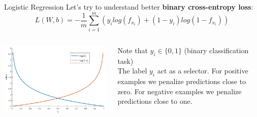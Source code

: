 \documentclass[aspectratio=169]{beamer}
\begin{document}
\begin{frame}{Logistic Regression}
Let's try to understand better \textbf{binary cross-entropy loss}:
\begin{equation}
L(W, b) = - \frac{1}{m} \sum_{i=1}^{m} \left(y_i log(f_{x_i}) + (1-y_i)log(1-f_{x_i})\right)
\end{equation}
\begin{columns}
\begin{column}{0.4\textwidth}
	\includegraphics[width=\textwidth]{img/dnn/log_plot.png}
\end{column}
\begin{column}{0.6\textwidth}
Note that $y_i \in \{0,1\}$ (binary classification task)\\
\vspace{0.5cm}
The label $y_i$ act as a selector. For positive examples we penalize predictions close to zero. For negative examples we penalize predictions close to one.
\end{column}
\end{columns}
\end{frame}

\end{document}
